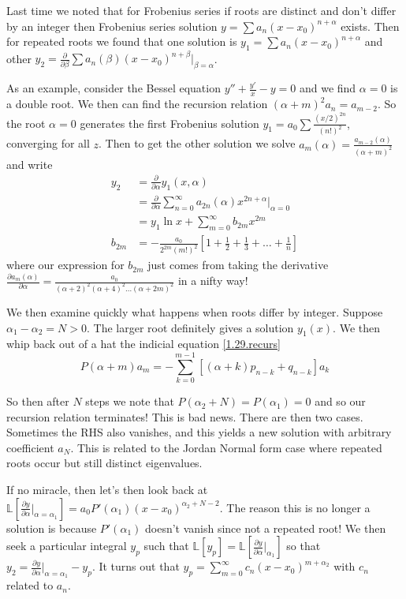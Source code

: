 \documentclass[10pt]{report}
\newcommand{\pd}[2]{\frac{\partial #1}{\partial#2}}
\begin{document}
Last time we noted that for Frobenius series if roots are distinct and don't differ by an integer then Frobenius series solution $y = \sum a_n(x-x_0)^{n+\alpha}$ exists. Then for repeated roots we found that one solution is $y_1 = \sum a_n(x-x_0)^{n+\alpha}$ and other $y_2 = \pd{}{\beta}\sum a_n(\beta)(x-x_0)^{n+\beta}\Big|_{\beta = \alpha}$. 

As an example, consider the Bessel equation $y'' + \frac{y'}{x} - y = 0$ and we find $\alpha = 0$ is a double root. We then can find the recursion relation $(\alpha + m)^2a_n = a_{m-2}$. So the root $\alpha = 0$ generates the first Frobenius solution $y_1 = a_0 \sum \frac{(x/2)^{2n}}{(n!)^2}$, converging for all $z$. Then to get the other solution we solve $a_m(\alpha) = \frac{a_{m-2}(\alpha)}{(\alpha + m)^2}$ and write
\begin{align}
    y_2 &= \pd{}{\alpha}y_1(x,\alpha) \\
    &= \pd{}{\alpha}\sum_{n=0}^{\infty}a_{2n}(\alpha)x^{2n+\alpha}\Big|_{\alpha = 0}\\
    &= y_1 \ln x +\sum_{m=0}^{\infty}b_{2m}x^{2m}\\
    b_{2m} &= -\frac{a_0}{2^{2m}(m!)^2}\left[ 1 + \frac{1}{2} + \frac{1}{3} +\dots + \frac{1}{n} \right]
\end{align}
where our expression for $b_{2m}$ just comes from taking the derivative $\pd{a_m(\alpha)}{\alpha} = \frac{a_0}{(\alpha + 2)^2 (\alpha + 4)^2 \dots(\alpha + 2m)^2}$ in a nifty way!

We then examine quickly what happens when roots differ by integer. Suppose $\alpha_1 - \alpha_2 = N > 0$. The larger root definitely gives a solution $y_1(x)$. We then whip back out of a hat the indicial equation \ref{1.29.recurs}
\begin{equation}
    P(\alpha + m)a_m = -\sum_{k=0}^{m-1}\left[ (\alpha + k)p_{n-k} + q_{n-k} \right]a_k
\end{equation}

So then after $N$ steps we note that $P(\alpha_2 + N) = P(\alpha_1) = 0$ and so our recursion relation terminates! This is bad news. There are then two cases. Sometimes the RHS also vanishes, and this yields a new solution with arbitrary coefficient $a_N$. This is related to the Jordan Normal form case where repeated roots occur but still distinct eigenvalues.

If no miracle, then let's then look back at $\mathbb{L}\left[ \pd{y}{\alpha}\Big|_{\alpha = \alpha_1} \right] = a_0P'(\alpha_1)(x-x_0)^{\alpha_2 +N-2}$. The reason this is no longer a solution is because $P'(\alpha_1)$ doesn't vanish since not a repeated root! We then seek a particular integral $y_p$ such that $\mathbb{L}[y_p] = \mathbb{L}\left[\pd{y}{\alpha}\Big|_{\alpha_1}\right]$ so that $y_2 = \pd{y}{\alpha}\Big|_{\alpha = \alpha_1} - y_p$. It turns out that $y_p = \sum_{m=0}^{\infty}c_n(x-x_0)^{m + \alpha_2}$ with $c_n$ related to $a_n$.
\end{document}
